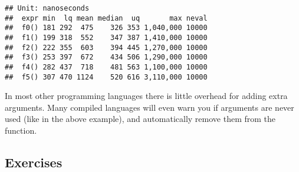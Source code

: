 \begin{Shaded}
\begin{Highlighting}[]
\StringTok{ }\NormalTok{() }
\StringTok{ }\NormalTok{(} \NormalTok{) }
\StringTok{ }\NormalTok{(} \NormalTok{, } \NormalTok{) }
\StringTok{ }\NormalTok{(} \NormalTok{, } \NormalTok{, } \NormalTok{) }
\StringTok{ }\NormalTok{(} \NormalTok{, } \NormalTok{, } \NormalTok{, } \NormalTok{) }
\StringTok{ }\NormalTok{(} \NormalTok{, } \NormalTok{, } \NormalTok{, } \NormalTok{, } \NormalTok{) }
\NormalTok{(}\NormalTok{(), }\NormalTok{(), }\NormalTok{(), }\NormalTok{(), }\NormalTok{(), }\NormalTok{(), } \NormalTok{)}
\end{Highlighting}
\end{Shaded}

\begin{verbatim}
## Unit: nanoseconds
##  expr min  lq mean median  uq       max neval
##  f0() 181 292  475    326 353 1,040,000 10000
##  f1() 199 318  552    347 387 1,410,000 10000
##  f2() 222 355  603    394 445 1,270,000 10000
##  f3() 253 397  672    434 506 1,290,000 10000
##  f4() 282 437  718    481 563 1,100,000 10000
##  f5() 307 470 1124    520 616 3,110,000 10000
\end{verbatim}

In most other programming languages there is little overhead for adding
extra arguments. Many compiled languages will even warn you if arguments
are never used (like in the above example), and automatically remove
them from the function.

\hypertarget{exercises-1}{%
\subsection{Exercises}\label{exercises-1}}

